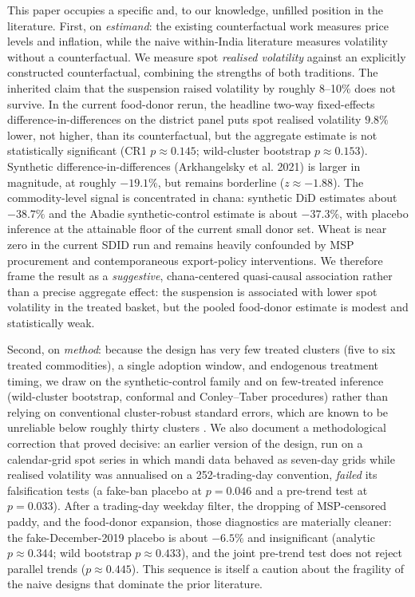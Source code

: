 This paper occupies a specific and, to our knowledge, unfilled position in the
literature. First, on \emph{estimand}: the existing counterfactual work measures price
levels and inflation, while the naive within-India literature measures volatility
without a counterfactual. We measure spot \emph{realised volatility} against an
explicitly constructed counterfactual, combining the strengths of both traditions. The
inherited claim that the suspension raised volatility by roughly 8--10\% does not
survive. In the current food-donor rerun, the headline two-way fixed-effects
difference-in-differences on the district panel puts spot realised volatility
$9.8\%$ lower, not higher, than its counterfactual, but the aggregate estimate is
not statistically significant (CR1 $p \approx 0.145$; wild-cluster bootstrap
$p \approx 0.153$). Synthetic difference-in-differences (Arkhangelsky et al. 2021)
is larger in magnitude, at roughly $-19.1\%$, but remains borderline
($z \approx -1.88$). The commodity-level signal is concentrated in chana:
synthetic DiD estimates about $-38.7\%$ and the Abadie synthetic-control estimate is
about $-37.3\%$, with placebo inference at the attainable floor of the current
small donor set. Wheat is near zero in the current SDID run and remains heavily
confounded by MSP procurement and contemporaneous export-policy interventions. We
therefore frame the result as a \emph{suggestive}, chana-centered quasi-causal
association rather than a precise aggregate effect: the suspension is associated
with lower spot volatility in the treated basket, but the pooled food-donor
estimate is modest and statistically weak.

Second, on \emph{method}: because the design has very few treated clusters (five to
six treated commodities), a single adoption window, and endogenous treatment timing,
we draw on the synthetic-control family \citep{Abadie2010, Arkhangelsky2021} and on
few-treated inference (wild-cluster bootstrap, conformal and Conley--Taber procedures)
rather than relying on conventional cluster-robust standard errors, which are known to
be unreliable below roughly thirty clusters \citep{MacKinnonWebb,
BertrandDufloMullainathan2004}. We also document a methodological correction that
proved decisive: an earlier version of the design, run on a calendar-grid spot series
in which mandi data behaved as seven-day grids while realised volatility was annualised
on a 252-trading-day convention, \emph{failed} its falsification tests (a fake-ban
placebo at $p=0.046$ and a pre-trend test at $p=0.033$). After a trading-day weekday
filter, the dropping of MSP-censored paddy, and the food-donor expansion, those
diagnostics are materially cleaner: the fake-December-2019 placebo is about
$-6.5\%$ and insignificant (analytic $p \approx 0.344$; wild bootstrap
$p \approx 0.433$), and the joint pre-trend test does not reject parallel trends
($p \approx 0.445$). This sequence is itself a caution about the fragility of the
naive designs that dominate the prior literature.


